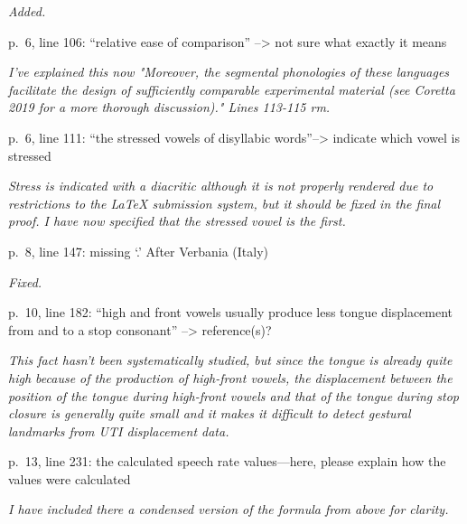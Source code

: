 \documentclass[]{article}
\begin{document}
\begin{adjustwidth}{1cm}{} \textit{
Added.
} \end{adjustwidth}

p.~6, line 106: ``relative ease of comparison'' --\textgreater{} not
sure what exactly it means

\begin{adjustwidth}{1cm}{} \textit{
I've explained this now "Moreover, the segmental phonologies of these languages facilitate the design of sufficiently comparable experimental material (see Coretta 2019 for a more thorough discussion)." Lines 113-115 rm.
} \end{adjustwidth}

p.~6, line 111: ``the stressed vowels of disyllabic
words''--\textgreater{} indicate which vowel is stressed

\begin{adjustwidth}{1cm}{} \textit{
Stress is indicated with a diacritic although it is not properly rendered due to restrictions to the LaTeX submission system, but it should be fixed in the final proof. I have now specified that the stressed vowel is the first.
} \end{adjustwidth}

p.~8, line 147: missing `.' After Verbania (Italy)

\begin{adjustwidth}{1cm}{} \textit{
Fixed.
} \end{adjustwidth}

p.~10, line 182: ``high and front vowels usually produce less tongue
displacement from and to a stop consonant'' --\textgreater{}
reference(s)?

\begin{adjustwidth}{1cm}{} \textit{
This fact hasn't been systematically studied, but since the tongue is already quite high because of the production of high-front vowels, the displacement between the position of the tongue during high-front vowels and that of the tongue during stop closure is generally quite small and it makes it difficult to detect gestural landmarks from UTI displacement data.
} \end{adjustwidth}

p.~13, line 231: the calculated speech rate values---here, please
explain how the values were calculated

\begin{adjustwidth}{1cm}{} \textit{
I have included there a condensed version of the formula from above for clarity.
} \end{adjustwidth}
\end{document}
